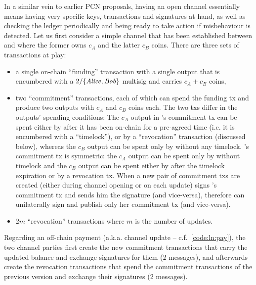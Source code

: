   In a similar vein to earlier PCN proposals, having an open channel essentially
  means having very specific keys, transactions and signatures at hand, as well
  as checking the ledger periodically and being ready to take action if
  misbehaviour is detected. Let us first consider a simple channel that has been
  established between \alice and \bob where the former owns $c_A$ and the latter
  $c_B$ coins. There are three sets of transactions at play:
  \begin{itemize}
    \item a single on-chain ``funding'' transaction with a single output that
    is encumbered with a $2/\{\mathit{Alice}, \mathit{Bob}\}$ multisig and carries $c_A + c_B$
    coins,
    \item two ``commitment'' transactions, each of which can spend the funding
    tx and produce two outputs with $c_A$ and $c_B$ coins each. The two txs
    differ in the outputs' spending conditions: The $c_A$ output in \alice's
    commitment tx can be spent either by \alice after it has been on-chain for a
    pre-agreed time (i.e. it is encumbered with a ``timelock''), or by a
    ``revocation'' transaction (discussed below), whereas the $c_B$ output can
    be spent only by \bob without any timelock. \bob's commitment tx is
    symmetric: the $c_A$ output can be spent only by \alice without timelock and
    the $c_B$ output can be spent either by \bob after the timelock expiration
    or by a revocation tx. When a new pair of commitment txs are created (either
    during channel opening or on each update) \alice signs \bob's commitment tx
    and sends him the signature (and vice-versa), therefore \alice can
    unilaterally sign and publish only her commitment tx (and vice-versa).
    \item $2m$ ``revocation'' transactions where $m$ is the number of updates.
  \end{itemize}

  Regarding an off-chain payment (a.k.a. channel update --
  c.f.~\ref{code:ln:pay}), the two channel parties first create the new
  commitment transactions that carry the updated balance and exchange signatures
  for them (2 messages), and afterwards create the revocation transactions that
  spend the commitment transactions of the previous version and exchange their
  signatures (2 messages).
